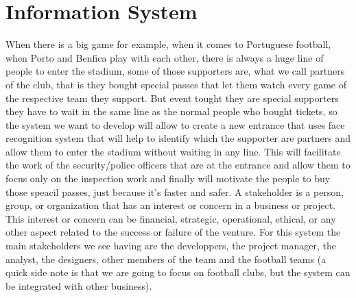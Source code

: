 \section{Information System}
When there is a big game for example, when it comes to Portuguese football, 
when Porto and Benfica play with each other, there is always a huge line of people to enter the stadium,
 some of those supporters are, what we  call partners of the club, that is they bought special passes 
 that let them watch every game of the respective team they support. But event tought they are special 
 supporters they have to wait in the same line as the normal people who bought tickets, so the 
 system we want to develop will allow to create a new entrance that uses face recognition system 
 that will help to identify which the supporter are partners and allow them to enter the 
 stadium without waiting in any line. This will facilitate the work of the security/police 
 officers that are at the entrance and allow them to focus only on the inspection 
 work and finally will motivate the people to buy those speacil passes, 
 just because it's faster and safer.
 A stakeholder is a person, group, or organization that has an interest or concern in a business or project. This interest or concern can be financial, strategic, operational, ethical, or any other aspect related to the success or failure of the venture. For this system the main stakeholders we see having are the developpers, the project manager, the analyst, the designers, other members of the team and the football teams (a quick side note is that we are going to focus on football clubs, but the system can be integrated with other business).